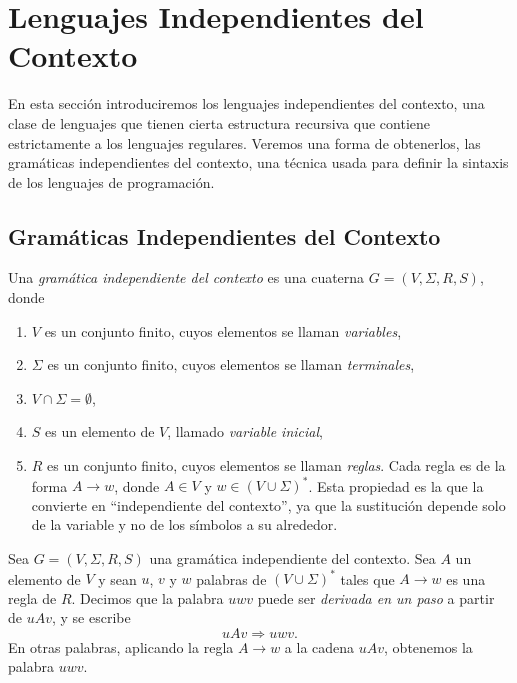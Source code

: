 \documentclass[twoside]{article}
\begin{document}
\tableofcontents

\newpage

\section{Lenguajes Independientes del Contexto}

En esta sección introduciremos los lenguajes independientes del contexto, una clase de lenguajes que tienen cierta estructura recursiva que contiene estrictamente a los lenguajes regulares. Veremos una forma de obtenerlos, las gramáticas independientes del contexto, una técnica usada para definir la sintaxis de los lenguajes de programación. 

\subsection{Gramáticas Independientes del Contexto}

\begin{defi}
Una \emph{gramática independiente del contexto} es una cuaterna $G=(V,\Sigma,R,S)$, donde
\begin{enumerate}
\item $V$ es un conjunto finito, cuyos elementos se llaman \emph{variables},
\item $\Sigma$ es un conjunto finito, cuyos elementos se llaman \emph{terminales},
\item $V\cap\Sigma=\emptyset$,
\item $S$ es un elemento de $V$, llamado \emph{variable inicial},
\item $R$ es un conjunto finito, cuyos elementos se llaman \emph{reglas}. Cada regla es de la forma $A\to w$, donde $A\in V$ y $w\in(V\cup\Sigma)^*$. Esta propiedad es la que la convierte en ``independiente del contexto'', ya que la sustitución depende solo de la variable y no de los símbolos a su alrededor.
\end{enumerate}
\end{defi}

\begin{defi}
Sea $G=(V,\Sigma,R,S)$ una gramática independiente del contexto. Sea $A$ un elemento de $V$ y sean $u$, $v$ y $w$ palabras de $(V\cup\Sigma)^*$ tales que $A\to w$ es una regla de $R$. Decimos que la palabra $uwv$ puede ser \emph{derivada en un paso} a partir de $uAv$, y se escribe
$$uAv\Rightarrow uwv.$$
En otras palabras, aplicando la regla $A\to w$ a la cadena $uAv$, obtenemos la palabra $uwv$.
\end{defi}
\end{document}
